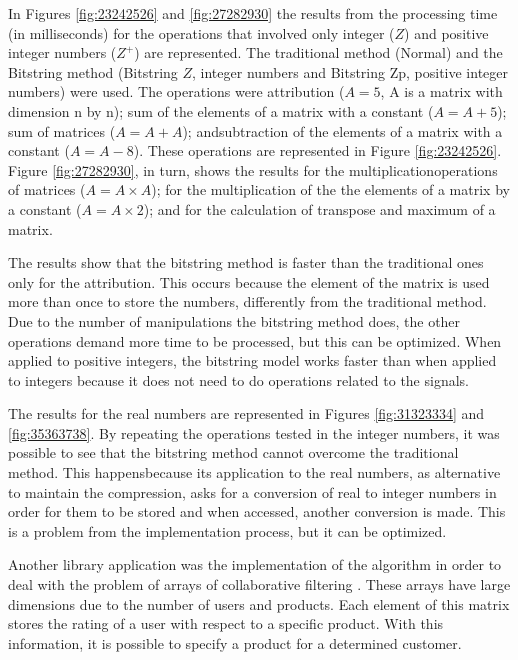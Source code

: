 \documentclass[10pt]{article}
\begin{document}
In Figures \ref{fig:23242526} and \ref{fig:27282930} the results from the 
processing time (in milliseconds) 
for the operations that involved only integer ($Z$) and positive integer numbers 
($Z^+$) are represented. 
The traditional method (Normal) and the Bitstring method (Bitstring $Z$, integer 
numbers and Bitstring Zp, 
positive integer numbers) were used. The operations were attribution ($A=5$, A 
is a matrix with dimension n by n); 
sum of the elements of a matrix with a constant ($A=A+5$); sum of matrices 
($A=A+A$); andsubtraction of the elements 
of a matrix with a constant ($A=A-8$). These operations are represented in 
Figure \ref{fig:23242526}. 
Figure \ref{fig:27282930}, in turn, shows the results for the 
multiplicationoperations of matrices ($A = A \times A$); 
for the multiplication of the the elements of a matrix by a constant ($A=A 
\times 2$); 
and for the calculation of transpose and maximum of a matrix.

The results show that the bitstring method is faster than the traditional ones 
only for the attribution.
This occurs because the element of the matrix is used more than once to store 
the numbers, differently 
from the traditional method. Due to the number of manipulations  the bitstring 
method does, the other 
operations  demand more time to be processed, but this can be optimized. When 
applied to positive integers, 
the bitstring model works faster than when applied to integers because it does 
not need to do operations 
related to the signals.

The results for the real numbers are represented in Figures \ref{fig:31323334} 
and \ref{fig:35363738}. 
By repeating the operations tested in the integer numbers, it was possible to 
see that the bitstring method 
cannot overcome the traditional method. This happensbecause its application to  
the real numbers, as alternative 
to maintain the compression, asks for a conversion of real to integer numbers in 
order for them to be stored and 
when accessed, another conversion is made. This is a problem from the 
implementation process, but it can be optimized.

Another library application was the implementation of the algorithm in order to 
deal with the problem of arrays of 
collaborative filtering \cite{cf}. These arrays have large dimensions due to the 
number of users and products. Each 
element of this matrix stores the rating of a user with respect to a specific 
product. With this information, it is 
possible to specify a product for a determined customer.
\end{document}
